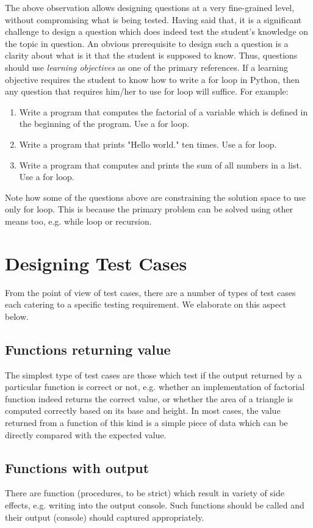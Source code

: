\documentclass{article}
\begin{document}
The above observation allows designing questions at a very fine-grained level, without compromising what is being tested. Having said that, it is a significant challenge to design a question which does indeed test the student's knowledge on the topic in question. An obvious prerequisite to design such a question is a clarity about what is it that the student is supposed to know. Thus, questions should use \textit{learning objectives} as one of the primary references. If a learning objective requires the student to know how to write a for loop in Python, then any question that requires him/her to use for loop will suffice. For example:
\begin{enumerate}
\item Write a program that computes the factorial of a variable \lstinline@x@ which is defined in the beginning of the program. Use a for loop.
\item Write a program that prints "Hello world." ten times. Use a for loop.
\item Write a program that computes and prints the sum of all numbers in a list. Use a for loop.
\end{enumerate}

Note how some of the questions above are constraining the solution space to use only for loop. This is because the primary problem can be solved using other means too, e.g. while loop or recursion.
\section{Designing Test Cases}
From the point of view of test cases, there are a number of types of test cases each catering to a specific testing requirement. We elaborate on this aspect below.
\subsection{Functions returning value}
The simplest type of test cases are those which test if the output returned by a particular function is correct or not, e.g. whether an implementation of factorial function indeed returns the correct value, or whether the area of a triangle is computed correctly based on its base and height. In most cases, the value returned from a function of this kind is a simple piece of data which can be directly compared with the expected value.
\subsection{Functions with output}
There are function (procedures, to be strict) which result in variety of side effects, e.g. writing into the output console. Such functions should be called and their output (console) should captured appropriately.
\end{document}
